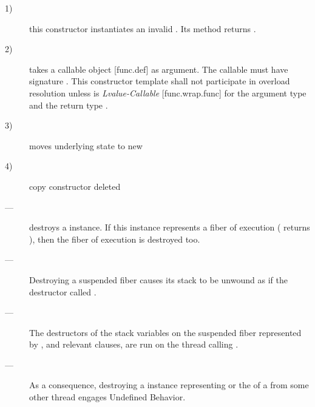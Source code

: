 \begin{description}
    \item[1)] this constructor instantiates an invalid \fiber. Its  method
              returns .
    \item[2)] takes a callable object [func.def] as
              argument. The callable must have signature . This constructor template shall not
              participate in overload resolution unless 
              is \emph{Lvalue-Callable} [func.wrap.func] for the argument
              type  and the return type \fiber.
               
    \item[3)] moves underlying state to new \fiber
    \item[4)] copy constructor deleted
\end{description}


\effects
\begin{description}
    \item[---] destroys a \fiber instance. If this instance represents a fiber
              of execution ( returns ), then the fiber of
              execution is destroyed too.
\end{description}

\remarks
\begin{description}
    \item[---] Destroying a suspended fiber causes its stack to be unwound as
               if the destructor called .
    \item[---] The destructors of the stack variables on the suspended fiber
               represented by , and relevant 
               clauses, are run on the thread calling \dtor.
    \item[---] As a consequence, destroying a \fiber instance
               representing \main or the \entryfn of a \thread from some other
               thread engages Undefined Behavior.
\end{description}

